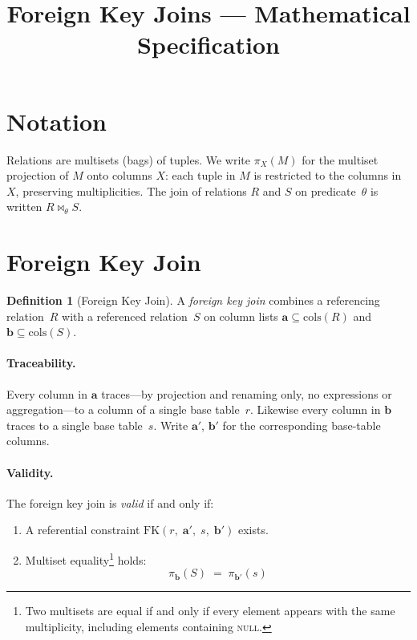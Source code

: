 \documentclass[11pt]{article}
\title{Foreign Key Joins --- Mathematical Specification}
\author{}
\date{}
\theoremstyle{definition}
\newtheorem{definition}{Definition}
\newcommand{\joins}{\bowtie}
\newcommand{\cols}{\mathrm{cols}}
\newcommand{\FK}{\mathrm{FK}}
\begin{document}
\maketitle

\tableofcontents
\bigskip

\section{Notation}

Relations are multisets (bags) of tuples.  We write $\pi_X(M)$ for
the multiset projection of $M$ onto columns $X$: each tuple in $M$
is restricted to the columns in~$X$, preserving multiplicities.  The
join of relations $R$ and $S$ on predicate~$\theta$ is written
$R \joins_\theta S$.


\section{Foreign Key Join}

\begin{definition}[Foreign Key Join]
A \emph{foreign key join} combines a referencing relation~$R$ with a
referenced relation~$S$ on column lists
$\mathbf{a} \subseteq \cols(R)$ and
$\mathbf{b} \subseteq \cols(S)$.
\end{definition}

\paragraph{Traceability.}
Every column in $\mathbf{a}$ traces---by projection and renaming
only, no expressions or aggregation---to a column of a single base
table~$r$.  Likewise every column in $\mathbf{b}$ traces to a single
base table~$s$.  Write $\mathbf{a'}$, $\mathbf{b'}$ for the
corresponding base-table columns.

\paragraph{Validity.}
The foreign key join is \emph{valid} if and only if:
\begin{enumerate}
\item A referential constraint
  $\FK(r,\;\mathbf{a'},\;s,\;\mathbf{b'})$ exists.
\item Multiset equality\footnote{Two multisets are equal if and only
  if every element appears with the same multiplicity, including
  elements containing \textsc{null}.} holds:
  \[
    \pi_{\mathbf{b}}(S) \;=\; \pi_{\mathbf{b'}}(s)
  \]
\end{enumerate}
\end{document}
